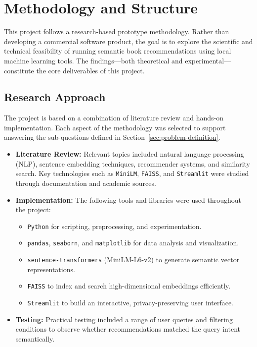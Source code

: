 \chapter{Methodology and Structure}
\label{chapter:methodology}

This project follows a research-based prototype methodology. 
Rather than developing a commercial software product, the goal is to explore the scientific and 
technical feasibility of running semantic book recommendations using local machine learning tools.
The findings—both theoretical and experimental—constitute the core deliverables of this project.

\section{Research Approach}
\label{sec:research-approach}

The project is based on a combination of literature review and hands-on implementation. 
Each aspect of the methodology was selected to support answering the sub-questions defined in Section~\ref{sec:problem-definition}.

\begin{itemize}
    \item \textbf{Literature Review:} Relevant topics included natural language processing (NLP), sentence embedding techniques, 
    recommender systems, and similarity search. Key technologies such as \texttt{MiniLM}, \texttt{FAISS}, 
    and \texttt{Streamlit} were studied through documentation and academic sources.
    
    \item \textbf{Implementation:} The following tools and libraries were used throughout the project:
    \begin{itemize}
        \item \texttt{Python} for scripting, preprocessing, and experimentation.
        \item \texttt{pandas}, \texttt{seaborn}, and \texttt{matplotlib} for data analysis and visualization.
        \item \texttt{sentence-transformers} (MiniLM-L6-v2) to generate semantic vector representations.
        \item \texttt{FAISS} to index and search high-dimensional embeddings efficiently.
        \item \texttt{Streamlit} to build an interactive, privacy-preserving user interface.
    \end{itemize}
    
    \item \textbf{Testing:} Practical testing included a range of user queries and filtering conditions to observe whether recommendations matched the query intent semantically.
\end{itemize}

